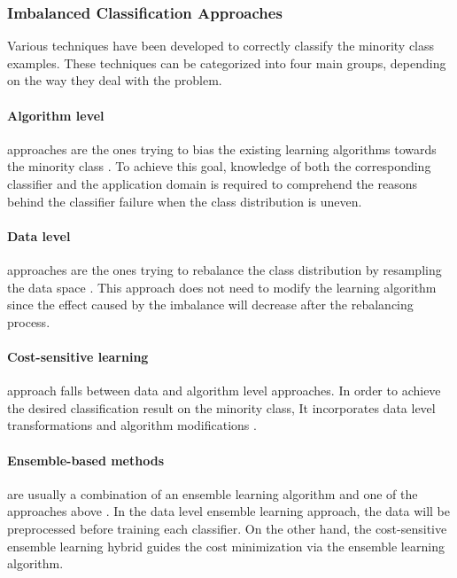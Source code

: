\subsubsection{Imbalanced Classification Approaches}
Various techniques have been developed to correctly classify the minority class examples. 
These techniques can be categorized into four main groups, depending on the way they deal 
with the problem.

\paragraph{Algorithm level} approaches are the ones trying to bias the existing learning 
algorithms towards the minority class \cite{lin_support_2002}. 
To achieve this goal, knowledge of both the corresponding classifier and the application 
domain is required to comprehend the reasons behind the classifier failure when the 
class distribution is uneven. 
 
\paragraph{Data level} approaches are the ones trying to rebalance the class distribution 
by resampling the data space \cite{batista_study_2004,fernandez_study_2008}. 
This approach does not need to modify the learning algorithm since the effect caused 
by the imbalance will decrease after the rebalancing process.
 
\paragraph{Cost-sensitive learning} approach falls between data and algorithm level 
approaches. In order to achieve the desired classification result on the minority 
class, It incorporates data level transformations and algorithm modifications 
\cite{ling_test_2006,chawla_automatically_2008}.
 
\paragraph{Ensemble-based methods} are usually a combination of an ensemble learning 
algorithm and one of the approaches above \cite{galar_review_2012}. In the data level ensemble learning 
approach, the data will be preprocessed before training each classifier. On the 
other hand, the  cost-sensitive ensemble learning hybrid guides the cost minimization 
via the ensemble learning algorithm. 

